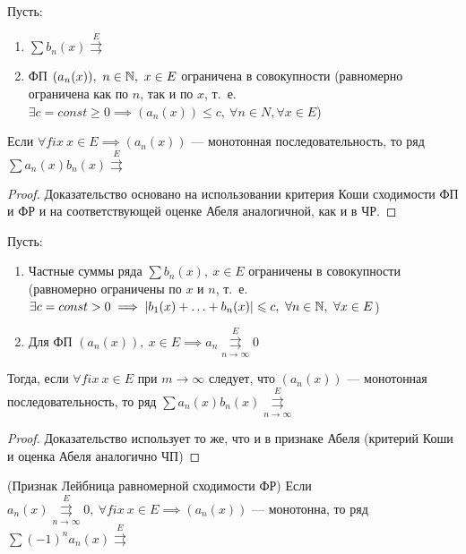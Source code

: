 \documentclass[../../main.tex]{subfiles}
\begin{document}
\begin{thm}
Пусть:
\begin{enumerate}
	\item $\sum b_n(x) \overset{E}{\rightrightarrows}$
	\item ФП $(a_n(x)),\ n \in \mathbb{N},\ x \in E$ ограничена 
в совокупности (равномерно ограничена как по $n$, так и по $x$, т.~е.
$\exists c = const \geq 0 \implies (a_n(x)) \leq c,\ 
\forall n \in N, \forall x \in E$)
\end{enumerate}
Если $\forall fix \ x \in E \implies (a_n(x))$ --- монотонная 
последовательность, то ряд $\sum a_n(x)b_n(x) \overset{E}{\rightrightarrows}$
\end{thm}	

\begin{proof}
Доказательство основано на использовании критерия Коши сходимости ФП и ФР и
на соответствующей оценке Абеля аналогичной, как и в ЧР.	
\end{proof}

\begin{thm}
Пусть:
\begin{enumerate}
	\item Частные суммы ряда $\sum b_n(x),\ x \in E$ 
ограничены в совокупности (равномерно ограничены по $x$ и $n$, 
т.~е. $\exists c = const > 0 \implies |b_1(x) + \ldots + b_n(x)| \leqslant c,\
\forall n \in \mathbb{N},\ \forall x \in E$)
	\item Для ФП $(a_n(x)),\ x \in E \implies a_n 
\overset{E}
{\underset{n \to \infty}\rightrightarrows} 0$
\end{enumerate}
Тогда, если $\forall fix \ x \in E$ при $m \to \infty$ следует, 
что $(a_n(x))$ --- монотонная последовательность, 
то ряд $\sum a_n(x)b_n(x) \overset{E}
{\underset{n \to \infty}\rightrightarrows}$
\end{thm}

\begin{proof}
Доказательство использует то же, что и в признаке Абеля (критерий Коши и 
оценка Абеля аналогично ЧП)
\end{proof}

\begin{crl*} (Признак Лейбница равномерной сходимости ФР)
Если $a_n(x) \overset{E}
{\underset{n \to \infty}\rightrightarrows} 0,\ \forall fix \ x \in E \implies
(a_n(x))$ --- монотонна, то ряд $\sum (-1)^n a_n(x) \overset{E}
{\rightrightarrows}$ 	
\end{crl*}
\end{document}
